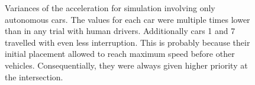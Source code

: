 \documentclass[11pt,english]{article}
\begin{document}
\begin{figure}[!] %
\caption{Variances of the acceleration for simulation involving only autonomous cars. The values for each car were multiple times lower than in any trial with human drivers. Additionally cars 1 and 7 travelled with even less interruption. This is probably because their initial placement allowed to reach maximum speed before other vehicles. Consequentially, they were always given higher priority at the intersection.}
\label{fig:acc_autonomous_only_var}
\end{figure} 


\begin{figure}[!] %
\caption{}
\label{fig:equilibrum}
\end{figure} 







\end{document}
